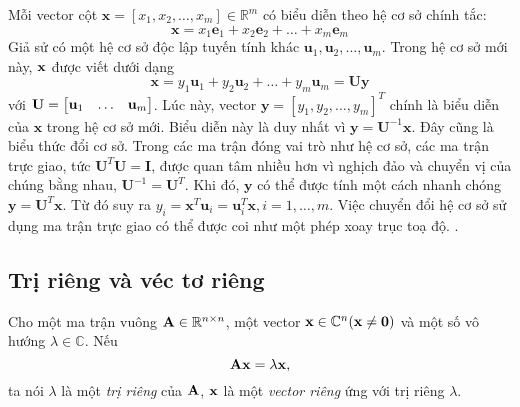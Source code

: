 Mỗi vector cột $\mathbf{x} = [x_1, x_2, \dots, x_m] \in \mathbb{R}^m$ có biểu diễn theo hệ cơ sở chính tắc:
\begin{equation}
\mathbf{x} = x_1 \mathbf{e}_1 + x_2 \mathbf{e}_2 + \dots + x_m\mathbf{e}_m
\end{equation}
Giả sử có một hệ cơ sở độc lập tuyến tính khác $\mathbf{u}_1, \mathbf{u}_2,
\dots, \mathbf{u}_m$. Trong hệ cơ sở mới này, $\mathbf{x}$ được viết dưới dạng
\begin{equation}
\mathbf{x} = y_1 \mathbf{u}_1 + y_2 \mathbf{u}_2 + \dots + y_m\mathbf{u}_m =
\mathbf{U}\mathbf{y}
\end{equation}
với $\mathbf{U} = \left[\begin{matrix} \mathbf{u}_1 & \dots &\mathbf{u}_m\end{matrix}\right]$. Lúc này, vector $\mathbf{y} =
[y_1, y_2, \dots, y_m]^T$ chính là biểu diễn của $\mathbf{x}$ trong hệ cơ sở
mới. Biểu diễn này là duy nhất vì $\mathbf{y} =
\mathbf{U}^{-1} \mathbf{x}$. Đây cũng là biểu thức đổi cơ sở.
Trong các ma trận đóng vai trò như hệ cơ sở, các ma
trận trực giao, tức $\mathbf{U}^T\mathbf{U} = \mathbf{I}$, được quan tâm nhiều
hơn vì nghịch đảo và chuyển vị của chúng bằng nhau, $\mathbf{U}^{-1} = \mathbf{U}^T$.
Khi đó, $\mathbf{y}$ có thể được tính một cách nhanh chóng $\mathbf{y} = \mathbf{U}^{T} \mathbf{x}$.
Từ đó suy ra $y_i = \mathbf{x}^T \mathbf{u}_i = \mathbf{u}_i^T\mathbf{x}, i= 1,
\dots, m$. Việc chuyển đổi hệ cơ sở sử dụng ma trận trực giao có thể được coi như một phép
xoay trục toạ độ. \cite{V1}.
\subsection{Trị riêng và véc tơ riêng}
Cho một ma trận vuông $\mathbf{A} \in \mathbb{R}^{n\times n}$, một vector $\mathbf{x} \in \mathbb{C}^n (\mathbf{x}
\neq \mathbf{0} )$ và một số vô hướng $\lambda \in \mathbb{C}$. Nếu
\begin{equation}
\mathbf{A}\mathbf{x} = \lambda \mathbf{x},
\end{equation}
ta nói $\lambda$ là một \textit{trị riêng} của $\mathbf{A}$, $\mathbf{x}$ là một \textit{vector riêng} ứng với trị riêng $\lambda$.

